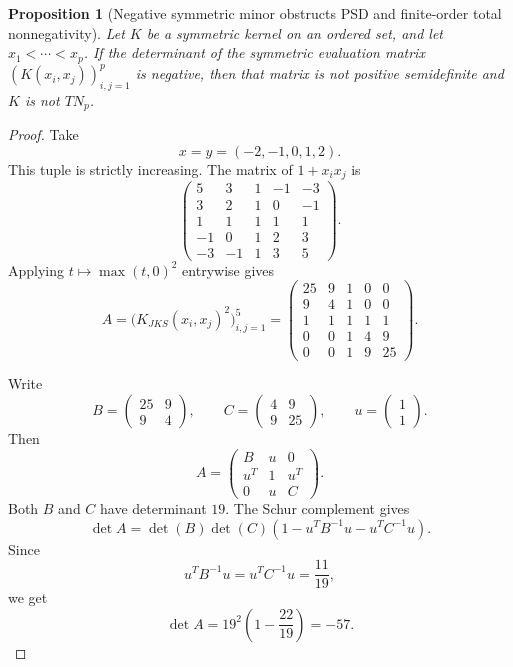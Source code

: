 \documentclass[11pt]{article}
\numberwithin{equation}{section}
\newtheorem{proposition}[theorem]{Proposition}
\theoremstyle{definition}
\theoremstyle{remark}
\newcommand{\1}{\mathbf 1}
\begin{document}
\begin{proposition}[Negative symmetric minor obstructs PSD and finite-order total nonnegativity]
\label{res:psd-minor-obstructs-tn}
Let \(K\) be a symmetric kernel on an ordered set, and let \(x_1<\cdots<x_p\). If the determinant of the symmetric evaluation matrix \((K(x_i,x_j))_{i,j=1}^p\) is negative, then that matrix is not positive semidefinite and \(K\) is not \(TN_p\).
\end{proposition}

\begin{proof}
Take
\[
x=y=(-2,-1,0,1,2).
\]
This tuple is strictly increasing. The matrix of \(1+x_i x_j\) is
\[
\begin{pmatrix}
5&3&1&-1&-3\\
3&2&1&0&-1\\
1&1&1&1&1\\
-1&0&1&2&3\\
-3&-1&1&3&5
\end{pmatrix}.
\]
Applying \(t\mapsto \max(t,0)^2\) entrywise gives
\[
A=\bigl(K_{JKS}(x_i,x_j)^2\bigr)_{i,j=1}^5
=
\begin{pmatrix}
25&9&1&0&0\\
9&4&1&0&0\\
1&1&1&1&1\\
0&0&1&4&9\\
0&0&1&9&25
\end{pmatrix}.
\]

Write
\[
B=\begin{pmatrix}25&9\\9&4\end{pmatrix},\qquad
C=\begin{pmatrix}4&9\\9&25\end{pmatrix},\qquad
u=\begin{pmatrix}1\\1\end{pmatrix}.
\]
Then
\[
A=
\begin{pmatrix}
B&u&0\\
u^T&1&u^T\\
0&u&C
\end{pmatrix}.
\]
Both \(B\) and \(C\) have determinant \(19\). The Schur complement gives
\[
\det A=\det(B)\det(C)\left(1-u^T B^{-1}u-u^T C^{-1}u\right).
\]
Since
\[
u^T B^{-1}u=u^T C^{-1}u=\frac{11}{19},
\]
we get
\[
\det A=19^2\left(1-\frac{22}{19}\right)=-57.
\]


\end{proof}
\end{document}

